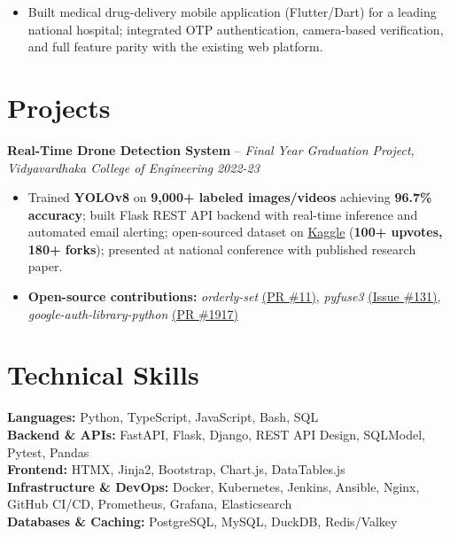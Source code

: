 \documentclass[10pt,a4paper]{article}
\begin{document}
\vspace{-2pt}
\begin{itemize}[leftmargin=*, itemsep=0.5pt, topsep=3pt]

\item Built medical drug-delivery mobile application (Flutter/Dart) for a leading national hospital; integrated OTP authentication, camera-based verification, and full feature parity with the existing web platform.

\end{itemize}

\section*{Projects}

\textbf{Real-Time Drone Detection System} -- \textit{Final Year Graduation Project, Vidyavardhaka College of Engineering} \hfill \textit{2022-23}

\vspace{-2pt}
\begin{itemize}[leftmargin=*, itemsep=0.5pt, topsep=2pt]

\item Trained \textbf{YOLOv8} on \textbf{9,000+ labeled images/videos} achieving \textbf{96.7\% accuracy}; built Flask REST API backend with real-time inference and automated email alerting; open-sourced dataset on \href{https://www.kaggle.com/code/Sammn/drone-detection-with-yolov8/comments}{Kaggle} (\textbf{100+ upvotes, 180+ forks}); presented at national conference with published research paper.

\item \textbf{Open-source contributions:} \textit{orderly-set} \href{https://github.com/seperman/orderly-set/pull/11}{(PR \#11)}, \textit{pyfuse3} \href{https://github.com/libfuse/pyfuse3/issues/131}{(Issue \#131)}, \textit{google-auth-library-python} \href{https://github.com/googleapis/google-auth-library-python/pull/1917}{(PR \#1917)}
\end{itemize}

\section*{Technical Skills}
\textbf{Languages:} Python, TypeScript, JavaScript, Bash, SQL \\
\textbf{Backend \& APIs:} FastAPI, Flask, Django, REST API Design, SQLModel, Pytest, Pandas \\
\textbf{Frontend:} HTMX, Jinja2, Bootstrap, Chart.js, DataTables.js \\
\textbf{Infrastructure \& DevOps:} Docker, Kubernetes, Jenkins, Ansible, Nginx, GitHub CI/CD, Prometheus, Grafana, Elasticsearch \\
\textbf{Databases \& Caching:} PostgreSQL, MySQL, DuckDB, Redis/Valkey
\end{document}
